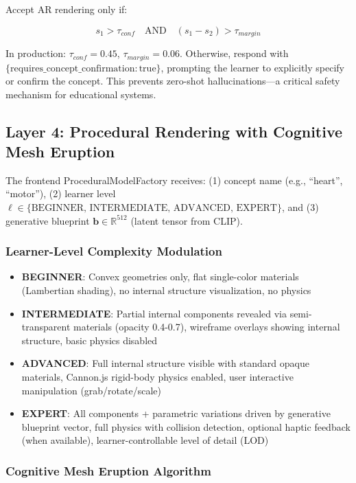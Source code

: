 \documentclass[conference]{IEEEtran}
\begin{document}
Accept AR rendering only if:

\begin{equation}
s_1 > \tau_{conf} \quad \text{AND} \quad (s_1 - s_2) > \tau_{margin}
\label{eq:gating}
\end{equation}

In production: $\tau_{conf} = 0.45$, $\tau_{margin} = 0.06$. Otherwise, respond with $\{\text{requires\_concept\_confirmation}: \text{true}\}$, prompting the learner to explicitly specify or confirm the concept. This prevents zero-shot hallucinations---a critical safety mechanism for educational systems.

\subsection{Layer 4: Procedural Rendering with Cognitive Mesh Eruption}

The frontend ProceduralModelFactory receives: (1) concept name (e.g., ``heart'', ``motor''), (2) learner level $\ell \in \{\text{BEGINNER, INTERMEDIATE, ADVANCED, EXPERT}\}$, and (3) generative blueprint $\mathbf{b} \in \mathbb{R}^{512}$ (latent tensor from CLIP).

\subsubsection{Learner-Level Complexity Modulation}

\begin{itemize}
    \item \textbf{BEGINNER}: Convex geometries only, flat single-color materials (Lambertian shading), no internal structure visualization, no physics
    \item \textbf{INTERMEDIATE}: Partial internal components revealed via semi-transparent materials (opacity 0.4-0.7), wireframe overlays showing internal structure, basic physics disabled
    \item \textbf{ADVANCED}: Full internal structure visible with standard opaque materials, Cannon.js rigid-body physics enabled, user interactive manipulation (grab/rotate/scale)
    \item \textbf{EXPERT}: All components + parametric variations driven by generative blueprint vector, full physics with collision detection, optional haptic feedback (when available), learner-controllable level of detail (LOD)
\end{itemize}

\subsubsection{Cognitive Mesh Eruption Algorithm}
\end{document}
